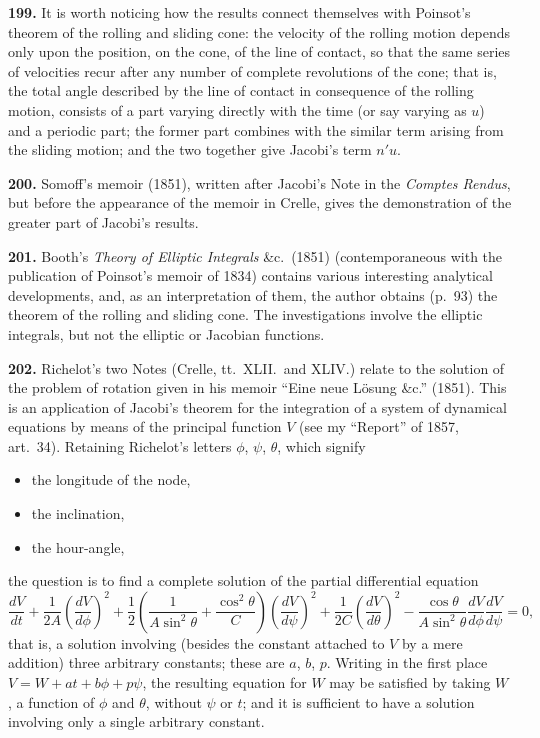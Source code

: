 \documentclass[11pt,a4paper]{article}
\theoremstyle{definition}
\begin{document}
\textbf{199.} It is worth noticing how the results connect themselves with Poinsot's theorem of the rolling and sliding cone: the velocity of the rolling motion depends only upon the position, on the cone, of the line of contact, so that the same series of velocities recur after any number of complete revolutions of the cone; that is, the total angle described by the line of contact in consequence of the rolling motion, consists of a part varying directly with the time (or say varying as $u$) and a periodic part; the former part combines with the similar term arising from the sliding motion; and the two together give Jacobi's term $n'u$.

\textbf{200.} Somoff's memoir (1851), written after Jacobi's Note in the \textit{Comptes Rendus}, but before the appearance of the memoir in Crelle, gives the demonstration of the greater part of Jacobi's results.

\textbf{201.} Booth's \textit{Theory of Elliptic Integrals} \&c.\ (1851) (contemporaneous with the publication of Poinsot's memoir of 1834) contains various interesting analytical developments, and, as an interpretation of them, the author obtains (p.~93) the theorem of the rolling and sliding cone. The investigations involve the elliptic integrals, but not the elliptic or Jacobian functions.

\textbf{202.} Richelot's two Notes (Crelle, tt.~XLII.\ and XLIV.) relate to the solution of the problem of rotation given in his memoir ``Eine neue L\"osung \&c.'' (1851). This is an application of Jacobi's theorem for the integration of a system of dynamical equations by means of the principal function $V$ (see my ``Report'' of 1857, art.~34). Retaining Richelot's letters $\phi$, $\psi$, $\theta$, which signify
\begin{itemize}[nosep]
    \item[$\phi$,] the longitude of the node,
    \item[$\theta$,] the inclination,
    \item[$\psi$,] the hour-angle,
\end{itemize}
the question is to find a complete solution of the partial differential equation
\[
\frac{dV}{dt} + \frac{1}{2A}\left(\frac{dV}{d\phi}\right)^2 + \frac{1}{2}\left(\frac{1}{A\sin^2\theta} + \frac{\cos^2\theta}{C}\right)\left(\frac{dV}{d\psi}\right)^2 + \frac{1}{2C}\left(\frac{dV}{d\theta}\right)^2 - \frac{\cos\theta}{A\sin^2\theta}\frac{dV}{d\phi}\frac{dV}{d\psi} = 0,
\]
that is, a solution involving (besides the constant attached to $V$ by a mere addition) three arbitrary constants; these are $a$, $b$, $p$. Writing in the first place $V = W + at + b\phi + p\psi$, the resulting equation for $W$ may be satisfied by taking $W$, a function of $\phi$ and $\theta$, without $\psi$ or $t$; and it is sufficient to have a solution involving only a single arbitrary constant.
\end{document}
